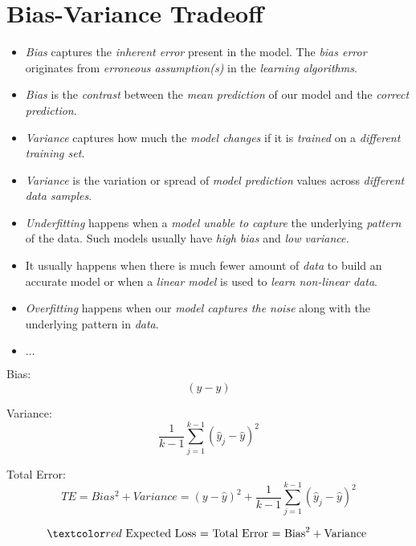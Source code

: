 \documentclass[
	number={5},
	title={Linear Regression}
]{cs584notes}
\begin{document}
\section{Bias-Variance Tradeoff}\label{sec:bias-variance-tradeoff}
\begin{itemize}
	\item \emph{Bias} captures the \emph{inherent error} present in the model.
	The \emph{bias error} originates from \emph{erroneous assumption(s)} in the \emph{learning algorithms}.
	\item \emph{Bias} is the \emph{contrast} between the \emph{mean prediction} of our model and the \emph{correct prediction}.
	\item \emph{Variance} captures how much the \emph{model changes} if it is \emph{trained} on a \emph{different training set}.
	\item \emph{Variance} is the variation or spread of \emph{model prediction} values across \emph{different data samples}.
	\item \emph{Underfitting} happens when a \emph{model unable to capture} the underlying \emph{pattern} of the data.
	Such models usually have \emph{high bias} and \emph{low variance.}
	\item It usually happens when there is much fewer amount of \emph{data} to build an accurate model or when a \emph{linear model} is used to \emph{learn non-linear data}.
	\item \emph{Overfitting} happens when our \emph{model captures the noise} along with the underlying pattern in \emph{data}.
	\item $\dots$
\end{itemize}

Bias:
\begin{equation}
	(y - \hat{y})
	\label{eq:bias}
\end{equation}

Variance:
\begin{equation}
	\frac{1}{k-1} \sum_{j=1}^{k-1} \left( \hat{y}_{j} - \hat{y} \right)^{2}
	\label{eq:variance}
\end{equation}

Total Error:
\begin{equation}
	TE = Bias^{2} + Variance = (y - \hat{y})^{2} + \frac{1}{k-1} \sum_{j=1}^{k-1} \left( \hat{y}_{j} - \hat{y} \right)^{2}
	\label{eq:total-error}
\end{equation}

\[ \data{ \mbox{ Expected Loss = Total Error = Bias}^{2} + \mbox{Variance } } \]
\end{document}

